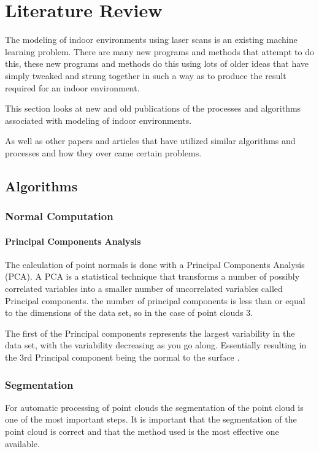\chapter{Literature Review}

	The modeling of indoor environments using laser scans is an existing machine learning problem. There are many new programs and methods that attempt to do this, these new programs and methods do this using lots of older ideas that have simply tweaked and strung together in such a way as to produce the result required for an indoor environment. 
	
	This section looks at new and old publications of the processes and algorithms associated with modeling of indoor environments.
	
	As well as other papers and articles that have utilized similar algorithms and processes and how they over came certain problems.
	
\section{Algorithms}
	\subsection{Normal Computation}
			\subsubsection{Principal Components Analysis}
			The calculation of point normals is done with a Principal Components Analysis (PCA). A PCA is a statistical technique that transforms a number of possibly correlated variables into a smaller number of uncorrelated variables called Principal components. the number of principal components is less than or equal to the dimensions of the data set, so in the case of point clouds 3.
			
			The first of the Principal components represents the largest variability in the data set, with the variability decreasing as you go along. Essentially resulting in the 3rd Principal component being the normal to the surface \citep{dunteman_principal_1989}. 

	\subsection{Segmentation}
		For automatic processing of point clouds the segmentation of the point cloud is one of the most important steps. It is important that the segmentation of the point cloud is correct and that the method used is the most effective one available.
		
